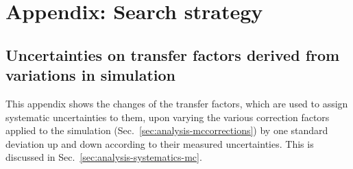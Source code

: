 \chapter{Appendix: Search strategy}
\label{app:analysis}



%


\section{Uncertainties on transfer factors derived from variations in 
simulation}
\label{app:tfvariations}
This appendix shows the changes of the transfer factors, which are used to 
assign systematic uncertainties to them, upon varying the various correction 
factors applied to the simulation (Sec.~\ref{sec:analysis-mccorrections}) by 
one standard deviation up and down according to their measured uncertainties. 
This is discussed in Sec.~\ref{sec:analysis-systematics-mc}.


